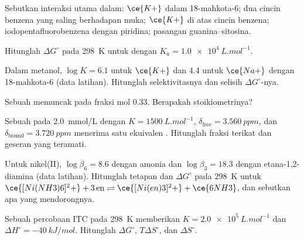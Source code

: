 \begin{exercise}[$\star$]\label{exo:b3:supramolecular:1}
Sebutkan interaksi utama dalam: $\ce{K+}$ dalam 18-mahkota-6; dua cincin benzena yang saling berhadapan muka;
$\ce{K+}$ di atas cincin benzena; iodopentafluorobenzena dengan piridina; pasangan
guanina--sitosina.
\end{exercise}

\begin{exercise}[$\star$]\label{exo:b3:supramolecular:2}
Hitunglah $\Delta G^\circ$ pada \qty{298}{K} untuk  dengan $K_a = \qty{1.0e4}{L.mol^{-1}}$.
\end{exercise}

\begin{exercise}[$\star$]\label{exo:b3:supramolecular:3}
Dalam metanol, $\log K = 6.1$ untuk $\ce{K+}$ dan 4.4 untuk $\ce{Na+}$ dengan 18-mahkota-6 (data latihan).
Hitunglah selektivitasnya dan selisih $\Delta G^\circ$-nya.
\end{exercise}

\begin{exercise}[$\star$]\label{exo:b3:supramolecular:4}
Sebuah  memuncak pada fraksi mol  0.33. Berapakah stoikiometrinya?
\end{exercise}

\begin{exercise}[$\star\star$]\label{exo:b3:supramolecular:5}
Sebuah  pada \qty{2.0}{mmol/L} dengan $K = \qty{1500}{L.mol^{-1}}$, $\delta_{\mathrm{free}} = \qty{3.560}{ppm}$, dan $\delta_{\mathrm{bound}} = \qty{3.720}{ppm}$ menerima satu
ekuivalen . Hitunglah fraksi terikat dan geseran yang teramati.
\end{exercise}

\begin{exercise}[$\star\star$]\label{exo:b3:supramolecular:6}
Untuk nikel(II), $\log\beta_6 = 8.6$ dengan amonia dan $\log\beta_3 = 18.3$ dengan etana-1,2-diamina (data
latihan). Hitunglah tetapan dan $\Delta G^\circ$ pada \qty{298}{K} untuk
$\ce{[Ni(NH3)6]^2+} + 3\,\mathrm{en} \rightleftharpoons \ce{[Ni(en)3]^2+} + \ce{6NH3}$, dan sebutkan apa yang mendorongnya.
\end{exercise}

\begin{exercise}[$\star\star$]\label{exo:b3:supramolecular:7}
Sebuah percobaan ITC pada \qty{298}{K} memberikan $K = \qty{2.0e5}{L.mol^{-1}}$ dan $\Delta H^\circ = \qty{-40}{kJ/mol}$. Hitunglah $\Delta G^\circ$, $T\Delta S^\circ$, dan
$\Delta S^\circ$.
\end{exercise}

